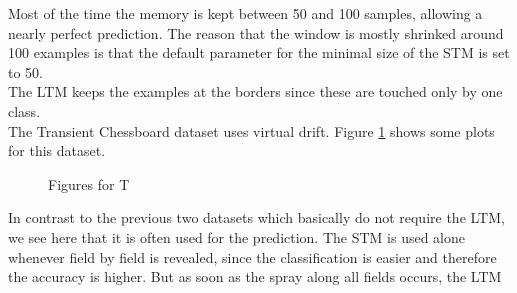 \documentclass[conference]{IEEEtran}
\begin{document}
Most of the time the memory is kept between 50 and 100 samples, allowing a nearly perfect prediction. 
The reason that the window is mostly shrinked around 100 examples is that the default parameter for the minimal size of the STM is set to 50.\\
The LTM keeps the examples at the borders since these are touched only by one class.\\
The Transient Chessboard dataset uses virtual drift. Figure \ref{fig:chess} shows some plots for this dataset.
\begin{figure}
\centering
	\vspace{0 pt}
\caption{Figures for T}
\label{fig:chess}
\end{figure}
In contrast to the previous two datasets which basically do not require the LTM, we see here that it 
is often used for the prediction. The STM is used alone whenever
field by field is revealed, since the classification is easier and therefore the accuracy is higher. But as soon as the spray along all fields occurs, the LTM
\end{document}

